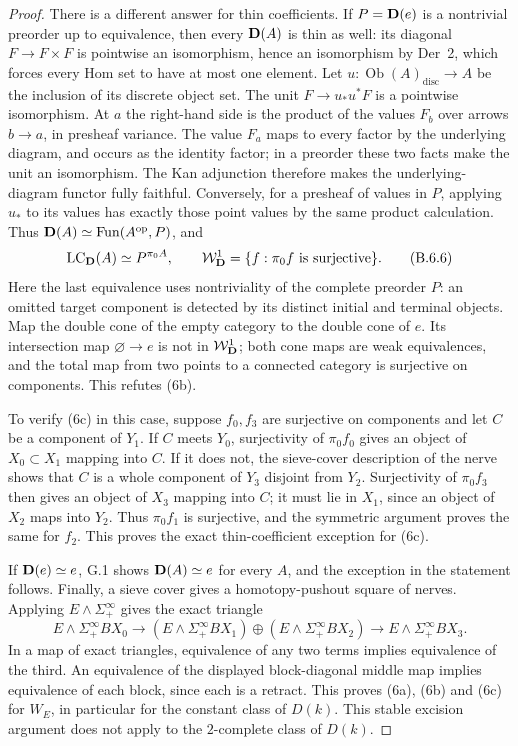 \begin{proof}
There is a different answer for thin coefficients.
If $P=\mathbf D(e)$ is a nontrivial preorder up to equivalence,
then every $\mathbf D(A)$ is thin as well: its diagonal
$F\to F\times F$ is pointwise an isomorphism,
hence an isomorphism by Der~2, which forces every
Hom set to have at most one element. Let
$u:\operatorname{Ob}(A)_{\mathrm{disc}}\to A$ be
the inclusion of its discrete object set. The
unit $F\to u_*u^*F$ is a pointwise isomorphism.
At $a$ the right-hand side is the product of the
values $F_b$ over arrows $b\to a$, in presheaf
variance. The value $F_a$ maps to every factor by
the underlying diagram, and occurs as the identity
factor; in a preorder these two facts make the
unit an isomorphism. The Kan adjunction therefore
makes the underlying-diagram functor fully faithful.
Conversely, for a presheaf of values in $P$, applying
$u_*$ to its values has exactly those point values
by the same product calculation. Thus
$\mathbf D(A)\simeq\operatorname{Fun}(A^{\mathrm{op}},P)$, and
\[
 \operatorname{LC}_\mathbf D(A)\simeq P^{\pi_0A},\qquad
 \mathcal W_{\mathbf D}^{1}=\{f:\pi_0f\text{ is surjective}\}.
\tag{B.6.6}
\]
Here the last equivalence uses nontriviality of the
complete preorder $P$: an omitted target component
is detected by its distinct initial and terminal
objects. Map the double cone of the empty category
to the double cone of $e$. Its intersection map
$\varnothing\to e$ is not in $\mathcal W_{\mathbf D}^{1}$; both cone
maps are weak equivalences, and the total map from
two points to a connected category is surjective
on components. This refutes (6b).

To verify (6c) in this case, suppose $f_0,f_3$
are surjective on components and let $C$ be a
component of $Y_1$. If $C$ meets $Y_0$, surjectivity
of $\pi_0f_0$ gives an object of $X_0\subset X_1$
mapping into $C$. If it does not, the sieve-cover
description of the nerve shows that $C$ is a whole
component of $Y_3$ disjoint from $Y_2$.
Surjectivity of $\pi_0f_3$ then gives an object
of $X_3$ mapping into $C$; it must lie in $X_1$,
since an object of $X_2$ maps into $Y_2$.
Thus $\pi_0f_1$ is surjective, and the symmetric
argument proves the same for $f_2$. This proves
the exact thin-coefficient exception for (6c).

If $\mathbf D(e)\simeq e$, G.1 shows $\mathbf D(A)\simeq e$ for
every $A$, and the exception in the statement follows.
Finally, a sieve cover gives a homotopy-pushout square of
nerves. Applying $E\wedge\Sigma^\infty_+$ gives the exact
triangle
\[
 E\wedge\Sigma^\infty_+BX_0\longrightarrow
 (E\wedge\Sigma^\infty_+BX_1)\oplus
 (E\wedge\Sigma^\infty_+BX_2)\longrightarrow
 E\wedge\Sigma^\infty_+BX_3.
\tag{B.6.4}
\]
In a map of exact triangles, equivalence of any two terms
implies equivalence of the third. An equivalence of the
displayed block-diagonal middle map implies equivalence of
each block, since each is a retract. This proves (6a), (6b)
and (6c) for $W_E$, in particular for the constant class
of $D(k)$. This stable excision argument does not apply to
the $2$-complete class of $D(k)$.
\end{proof}

